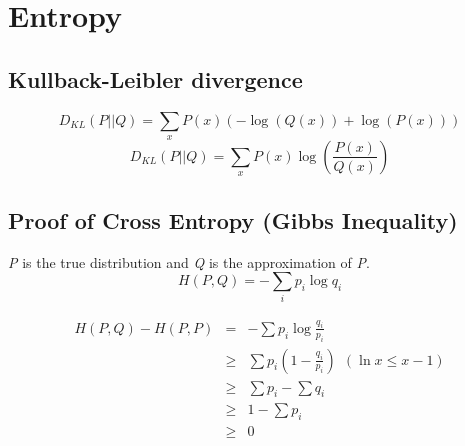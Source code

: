 \documentclass[twocolumn]{article}
\begin{document}
\section{Entropy}

\subsection{Kullback-Leibler divergence}
\[D_{KL}(P||Q) = \sum_x{P(x) (-\log(Q(x)) + \log(P(x)) )}\]
\[D_{KL}(P||Q) = \sum_x{P(x) \log(\frac{P(x)}{Q(x)})} \]

\subsection{Proof of Cross Entropy (Gibbs Inequality)}
\emph{P} is the true distribution and \emph{Q} is the approximation of \emph{P}.
\[H(P, Q) = -\sum_i{p_i \log q_i} \]

\begin{eqnarray*}
H(P, Q) - H(P, P) &=& -\sum{p_i \log \frac{q_i}{p_i}} \\
				& \geq & \sum{p_i (1-\frac{q_i}{p_i})} ~~(\ln x \leq x-1)\\
				& \geq & \sum{p_i} - \sum{q_i}\\
				& \geq & 1 - \sum{p_i}\\
				& \geq & 0
\end{eqnarray*}
\end{document}
